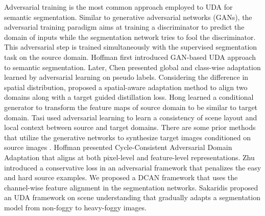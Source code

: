 \documentclass[10pt,twocolumn,letterpaper]{article}
\begin{document}
Adversarial training is the most common approach employed to UDA for semantic segmentation. Similar to generative adversarial networks (GANs), the adversarial training paradigm aims at training a discriminator to predict the domain of inputs while the segmentation network tries to fool the discriminator. 
This adversarial step is trained simultaneously with the supervised segmentation task on the source domain.
Hoffman \etal \cite{hoffman2016fcns} first introduced GAN-based UDA approach to semantic segmentation. Later, Chen \etal \cite{chen2017no} presented global and class-wise adaptation learned by adversarial learning on pseudo labels. Considering the difference in spatial distribution, \cite{chen2018road} proposed a spatial-aware adaptation method to align two domains along with a target guided distillation loss. Hong \etal \cite{hong2018CVPR} learned a conditional generator to transform the feature maps of source domain to be similar to target domain. 
Tasi \etal \cite{tsai2018learning} used adversarial learning to learn a consistency of scene layout and local context between source and target domains. There are some prior methods that utilize the generative networks to synthesize target images conditioned on source images \cite{zhu2017unpaired, murez2018CVPR}. Hoffman \etal \cite{hoffman18a} presented Cycle-Consistent Adversarial Domain Adaptation that aligns at both pixel-level and feature-level representations. Zhu~\etal \cite{zhu2018ECCV} introduced a conservative loss in an adversarial framework that penalizes the easy and hard source examples. We \etal \cite{wu2018dcan} proposed a DCAN framework that uses the channel-wise feature alignment in the segmentation networks.
Sakaridis \etal \cite{SDHV18} proposed an UDA framework on scene understanding that gradually adapts a segmentation model 
from non-foggy to heavy-foggy images.
\end{document}
